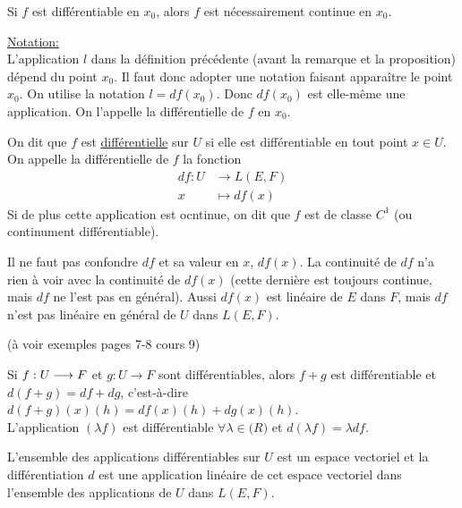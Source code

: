 \documentclass[12pt,a4paper]{article}
\begin{document}
\begin{flushleft}
\begin{prop}
Si $f$ est différentiable en $x_0$, alors $f$ est nécessairement continue en $x_0$.
\end{prop}

\underline{Notation:}\\
L'application $l$ dans la définition précédente (avant la remarque et la proposition) dépend du point $x_0$. Il faut donc adopter une notation faisant apparaître le point $x_0$. On utilise la notation $l = df(x_0)$. Donc $df(x_0)$ est elle-même une application. On l'appelle la différentielle de $f$ en $x_0$.

\begin{mydef}
On dit que $f$ est \underline{différentielle} sur $U$ si elle est différentiable en tout point $x \in U$. On appelle la différentielle de $f$ la fonction
\begin{align*}
df : U & \longrightarrow L(E,F)\\
      x	& \longmapsto df(x)
\end{align*}
Si de plus cette application est ocntinue, on dit que $f$ est de classe $C^1$ (ou continument différentiable).
\end{mydef}

\begin{rem}
Il ne faut pas confondre $df$ et sa valeur en $x$, $df(x)$. La continuité de $df$ n'a rien à voir avec la continuité de $df(x)$ (cette dernière est toujours continue, mais $df$ ne l'est pas en général). Aussi $df(x)$ est linéaire de $E$ dans $F$, mais $df$ n'est pas linéaire en général de $U$ dans $L(E,F)$.
\end{rem}

(à voir exemples pages 7-8 cours 9)\\

\begin{thm}
Si $\textit{$f:U \longrightarrow F$}$ et $g: U \longrightarrow F$ sont différentiables, alors $f+g $ est différentiable et $d(f+g) = df + dg$, c'est-à-dire $d(f+g)(x)(h) = df(x)(h) + dg(x)(h)$.\\L'application $( \lambda f )$ est différentiable $\forall \lambda \in \mathbb(R)$ et $d( \lambda f) = \lambda df$.
\end{thm}

\begin{rem}
L'ensemble des applications différentiables sur $U$ est un espace vectoriel et la différentiation $d$ est une application linéaire de cet espace vectoriel dans l'ensemble des applications de $U$ dans $L(E,F)$.
\end{rem}































\end{flushleft}
\end{document}
